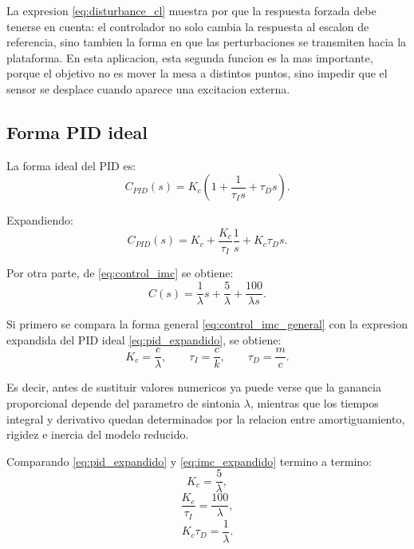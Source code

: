 \documentclass[11pt]{article}
\begin{document}
La expresion \eqref{eq:disturbance_cl} muestra por que la respuesta forzada debe tenerse en cuenta: el controlador no solo cambia la respuesta al escalon de referencia, sino tambien la forma en que las perturbaciones se transmiten hacia la plataforma. En esta aplicacion, esta segunda funcion es la mas importante, porque el objetivo no es mover la mesa a distintos puntos, sino impedir que el sensor se desplace cuando aparece una excitacion externa.

\subsection{Forma PID ideal}

La forma ideal del PID es:
\begin{equation}
C_{PID}(s)=K_c\left(1+\frac{1}{\tau_I s}+\tau_D s\right).
\label{eq:pid_ideal}
\end{equation}

Expandiendo:
\begin{equation}
C_{PID}(s)=K_c+\frac{K_c}{\tau_I}\frac{1}{s}+K_c\tau_D s.
\label{eq:pid_expandido}
\end{equation}

Por otra parte, de \eqref{eq:control_imc} se obtiene:
\begin{equation}
C(s)=\frac{1}{\lambda}s+\frac{5}{\lambda}+\frac{100}{\lambda s}.
\label{eq:imc_expandido}
\end{equation}

Si primero se compara la forma general \eqref{eq:control_imc_general} con la expresion expandida del PID ideal \eqref{eq:pid_expandido}, se obtiene:
\begin{equation}
K_c=\frac{c}{\lambda},
\qquad
\tau_I=\frac{c}{k},
\qquad
\tau_D=\frac{m}{c}.
\label{eq:parametros_pid_generales}
\end{equation}

Es decir, antes de sustituir valores numericos ya puede verse que la ganancia proporcional depende del parametro de sintonia $\lambda$, mientras que los tiempos integral y derivativo quedan determinados por la relacion entre amortiguamiento, rigidez e inercia del modelo reducido.

Comparando \eqref{eq:pid_expandido} y \eqref{eq:imc_expandido} termino a termino:
\begin{equation}
K_c=\frac{5}{\lambda},
\end{equation}
\begin{equation}
\frac{K_c}{\tau_I}=\frac{100}{\lambda},
\end{equation}
\begin{equation}
K_c\tau_D=\frac{1}{\lambda}.
\end{equation}
\end{document}
